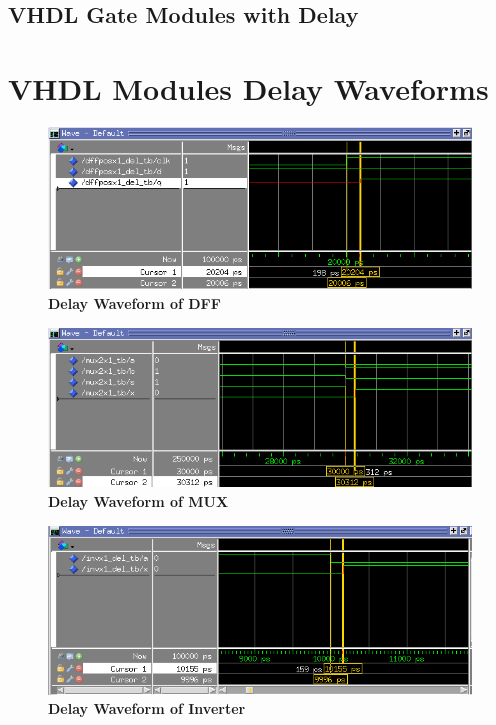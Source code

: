 \documentclass[a4paper]{article}
\begin{document}
\subsection{\textbf{VHDL Gate Modules with Delay}}

    
    
    

\section{\textbf{VHDL Modules Delay Waveforms}}
    \begin{figure}[H]
        \centering
        \includegraphics[width=\textwidth,height=\textheight,keepaspectratio]{../../vhdl/delay_waveforms/dff_delay.png}
        \caption{\textbf{Delay Waveform of DFF}}
        \label{fig:gg}
    \end{figure}
    \begin{figure}[H]
        \centering
        \includegraphics[width=\textwidth,height=\textheight,keepaspectratio]{../../vhdl/delay_waveforms/mux_delay.png}
        \caption{\textbf{Delay Waveform of MUX}}
        \label{fig:gg}
    \end{figure}
    \begin{figure}[H]
        \centering
        \includegraphics[width=\textwidth,height=\textheight,keepaspectratio]{../../vhdl/delay_waveforms/inv_delay.png}
        \caption{\textbf{Delay Waveform of Inverter}}
        \label{fig:gg}
    \end{figure}
\end{document}
